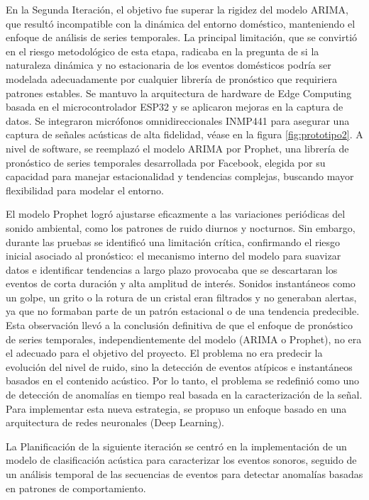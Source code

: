       En la Segunda Iteración, el objetivo fue superar la rigidez del modelo ARIMA, que resultó incompatible con la dinámica del entorno doméstico, manteniendo el enfoque de análisis de series temporales. La principal limitación, que se convirtió en el riesgo metodológico de esta etapa, radicaba en la pregunta de si la naturaleza dinámica y no estacionaria de los eventos domésticos podría ser modelada adecuadamente por cualquier librería de pronóstico que requiriera patrones estables. Se mantuvo la arquitectura de hardware de Edge Computing basada en el microcontrolador ESP32 y se aplicaron mejoras en la captura de datos. Se integraron micrófonos omnidireccionales INMP441 para asegurar una captura de señales acústicas de alta fidelidad, véase en la figura \ref{fig:prototipo2}. A nivel de software, se reemplazó el modelo ARIMA por Prophet, una librería de pronóstico de series temporales desarrollada por Facebook, elegida por su capacidad para manejar estacionalidad y tendencias complejas, buscando mayor flexibilidad para modelar el entorno.
      
      El modelo Prophet logró ajustarse eficazmente a las variaciones periódicas del sonido ambiental, como los patrones de ruido diurnos y nocturnos. Sin embargo, durante las pruebas se identificó una limitación crítica, confirmando el riesgo inicial asociado al pronóstico: el mecanismo interno del modelo para suavizar datos e identificar tendencias a largo plazo provocaba que se descartaran los eventos de corta duración y alta amplitud de interés. Sonidos instantáneos como un golpe, un grito o la rotura de un cristal eran filtrados y no generaban alertas, ya que no formaban parte de un patrón estacional o de una tendencia predecible. Esta observación llevó a la conclusión definitiva de que el enfoque de pronóstico de series temporales, independientemente del modelo (ARIMA o Prophet), no era el adecuado para el objetivo del proyecto. El problema no era predecir la evolución del nivel de ruido, sino la detección de eventos atípicos e instantáneos basados en el contenido acústico. Por lo tanto, el problema se redefinió como uno de detección de anomalías en tiempo real basada en la caracterización de la señal. Para implementar esta nueva estrategia, se propuso un enfoque basado en una arquitectura de redes neuronales (Deep Learning). 

      La Planificación de la siguiente iteración se centró en la implementación de un modelo de clasificación acústica para caracterizar los eventos sonoros, seguido de un análisis temporal de las secuencias de eventos para detectar anomalías basadas en patrones de comportamiento. 
      

